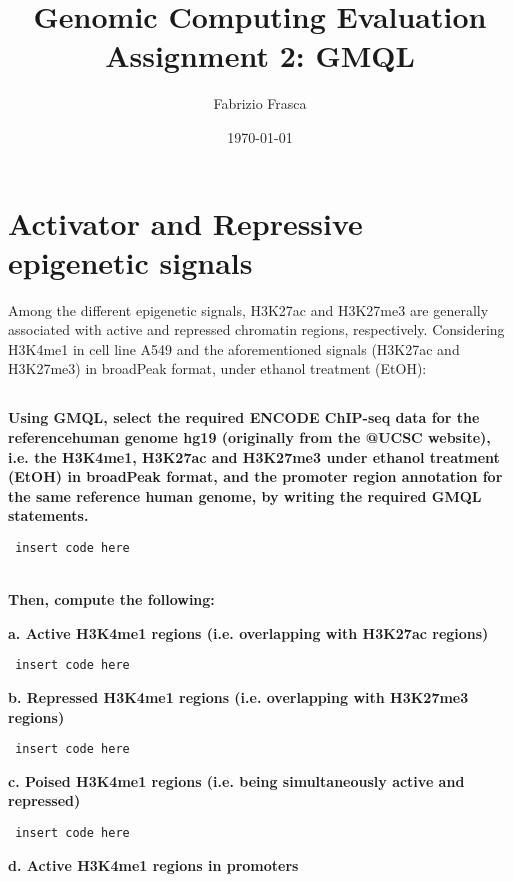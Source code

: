 \documentclass[12pt, a4paper]{article}
\title{\textbf{Genomic Computing Evaluation}\\Assignment 2: GMQL}
\author{Fabrizio Frasca}
\date{\today}
\begin{document}
	
\maketitle
\clearpage

\section{Activator and Repressive epigenetic signals}

Among the different epigenetic signals, H3K27ac and H3K27me3 are generally associated with active and repressed chromatin regions, respectively. Considering H3K4me1 in cell line A549 and the aforementioned signals (H3K27ac and H3K27me3) in broadPeak format, under ethanol treatment (EtOH):

\subsection{}

\textbf{Using GMQL, select the required ENCODE ChIP-seq data for the referencehuman genome hg19 (originally from the @UCSC website), i.e. the H3K4me1, H3K27ac and H3K27me3 under ethanol treatment (EtOH) in broadPeak format, and the promoter region annotation for the same reference human genome, by writing the required GMQL statements.}

\begin{verbatim} insert code here \end{verbatim}

\textbf{\\Then, compute the following:}

\textbf{a. Active H3K4me1 regions (i.e. overlapping with H3K27ac regions)}

\begin{verbatim} insert code here \end{verbatim}

\textbf{b. Repressed H3K4me1 regions (i.e. overlapping with H3K27me3 regions)}


\begin{verbatim} insert code here \end{verbatim} 

\textbf{c. Poised H3K4me1 regions (i.e. being simultaneously active and repressed)}

\begin{verbatim} insert code here \end{verbatim} 

\textbf{d. Active H3K4me1 regions in promoters}
\end{document}
